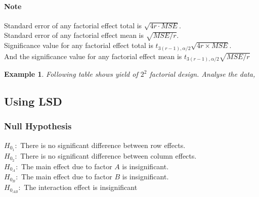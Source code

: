 \documentclass[oneside,11pt,pdftex]{book}%
\numberwithin{equation}{section}
\newtheorem{example}[theorem]{Example}
\numberwithin{section}{chapter}
\numberwithin{equation}{chapter}
\begin{document}
\paragraph{Note}
Standard error of any factorial effect total is $ \sqrt{4r\cdot MSE} $.\\
Standard error of any factorial effect mean is $\sqrt{MSE/r}$.\\
Significance value for any factorial effect total is $ t_{3(r-1),\alpha/2}\sqrt{4r\times MSE} $.\\
And the significance value for any factorial effect mean is $ t_{3(r-1),\alpha/2}\sqrt{MSE/r} $


\begin{example}
	Following table shows yield of $ 2^2 $ factorial design. Analyse the data,
\end{example}

\subsection{Using LSD}
\subsubsection{Null Hypothesis}
$ H_{0_1}: $ There is no significant difference between row effects.\\
$ H_{0_2}: $ There is no significant difference between column effects.\\
$ H_{0_A}: $ The main effect due to factor $ A $ is insignificant.\\
$ H_{0_B} :$ The main effect due to factor $ B $ is insignificant.\\
$ H_{0_{AB}}: $ The interaction effect is insignificant
\end{document}
